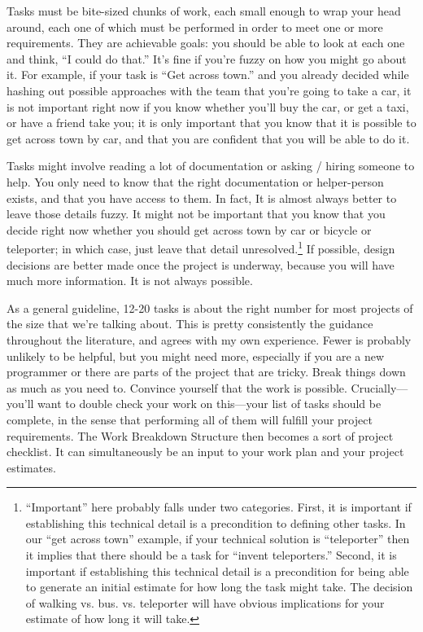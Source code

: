 \documentclass[12pt,oneside]{book}
\begin{document}
Tasks must be bite-sized chunks of work, each small enough to wrap your head around, each one of which must be performed in order to meet one or more requirements. They are achievable goals: you should be able to look at each one and think, ``I could do that.'' It's fine if you're fuzzy on how you might go about it. For example, if your task is ``Get across town.'' and you already decided while hashing out possible approaches with the team that you're going to take a car, it is not important right now if you know whether you'll buy the car, or get a taxi, or have a friend take you; it is only important that you know that it is possible to get across town by car, and that you are confident that you will be able to do it.

Tasks might involve reading a lot of documentation or asking / hiring someone to help. You only need to know that the right documentation or helper-person exists, and that you have access to them. In fact, It is almost always better to leave those details fuzzy. It might not be important that you know that you decide right now whether you should get across town by car or bicycle or teleporter; in which case, just leave that detail unresolved.\footnote{
``Important'' here probably falls under two categories. First, it is important if establishing this technical detail is a precondition to defining other tasks. In our ``get across town'' example, if your technical solution is ``teleporter'' then it implies that there should be a task for ``invent teleporters.'' Second, it is important if establishing this technical detail is a precondition for being able to generate an initial estimate for how long the task might take. The decision of walking vs. bus. vs. teleporter will have obvious implications for your estimate of how long it will take.}
If possible, design decisions are better made once the project is underway, because you will have much more information. It is not always possible.

As a general guideline, 12-20 tasks is about the right number for most projects of the size that we're talking about. This is pretty consistently the guidance throughout the literature, and agrees with my own experience. Fewer is probably unlikely to be helpful, but you might need more, especially if you are a new programmer or there are parts of the project that are tricky. Break things down as much as you need to. Convince yourself that the work is possible.
Crucially---you'll want to double check your work on this---your list of tasks should be complete, in the sense that performing all of them will fulfill your project requirements. The Work Breakdown Structure then becomes a sort of project checklist. It can simultaneously be an input to your work plan and your project estimates.
\end{document}
